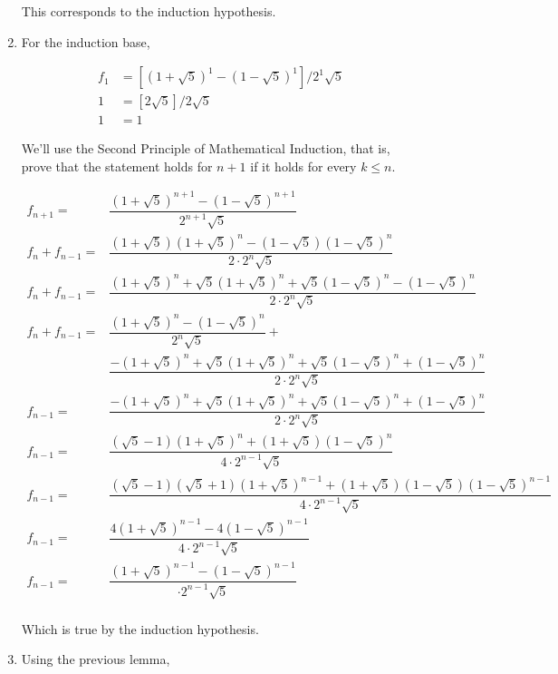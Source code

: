 \begin{description}
\begin{enumerate}
This corresponds to the induction hypothesis.

\item For the induction base,

\begin{align*}
f_1 &= \left[(1 + \sqrt 5)^1 - (1 - \sqrt 5)^1\right] / 2^1 \sqrt 5 \\
1 &= \left[2\sqrt5\right] / 2\sqrt5 \\
1 &= 1
\end{align*}

We'll use the Second Principle of Mathematical Induction, that is, prove that
the statement holds for $n+1$ if it holds for every $k \le n$.

\begin{align*}
f_{n+1} =& \dfrac{(1 + \sqrt 5)^{n+1} -
           (1 - \sqrt 5)^{n+1}} {2^{n+1} \sqrt 5} \\
f_n + f_{n-1} =& \dfrac{(1 + \sqrt 5) (1 + \sqrt 5)^n -
           (1 - \sqrt 5)(1 - \sqrt 5)^n} {2 \cdot 2^n \sqrt 5} \\
f_n + f_{n-1} =& \dfrac{(1 + \sqrt 5)^n + \sqrt 5 (1 + \sqrt 5)^n + \sqrt 5
           (1 - \sqrt 5)^n - (1 - \sqrt 5)^n }{2 \cdot 2^n \sqrt 5} \\
f_n + f_{n-1} =& \dfrac{(1 + \sqrt 5)^n - (1 - \sqrt 5)^n} {2^n \sqrt 5} + \\
              &  \dfrac{-(1 + \sqrt 5)^n + \sqrt 5 (1 + \sqrt 5)^n + \sqrt 5
           (1 - \sqrt 5)^n + (1 - \sqrt 5)^n }{2 \cdot 2^n \sqrt 5} \\
f_{n-1} =& \dfrac{-(1 + \sqrt 5)^n + \sqrt 5 (1 + \sqrt 5)^n + \sqrt 5
           (1 - \sqrt 5)^n + (1 - \sqrt 5)^n }{2 \cdot 2^n \sqrt 5} \\
f_{n-1} =& \dfrac{(\sqrt 5 - 1) (1 + \sqrt 5)^n + (1 + \sqrt 5)
           (1 - \sqrt 5)^n}{4 \cdot 2^{n-1} \sqrt 5} \\
f_{n-1} =& \dfrac{(\sqrt 5 - 1)(\sqrt 5 + 1) (1 + \sqrt 5)^{n-1} +
           (1 + \sqrt 5)(1 - \sqrt 5)
           (1 - \sqrt 5)^{n-1}}{4 \cdot 2^{n-1} \sqrt 5} \\
f_{n-1} =& \dfrac{4 (1 + \sqrt 5)^{n-1} -4 (1 - \sqrt 5)^{n-1}}
           {4 \cdot 2^{n-1} \sqrt 5} \\
f_{n-1} =& \dfrac{(1 + \sqrt 5)^{n-1} - (1 - \sqrt 5)^{n-1}}
           {\cdot 2^{n-1} \sqrt 5} \\
\end{align*}

Which is true by the induction hypothesis.

\item Using the previous lemma,


\end{enumerate}
\end{description}

